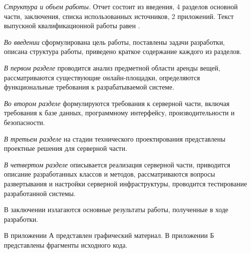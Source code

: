 \emph{Структура и объем работы.} Отчет состоит из введения, 4 разделов основной части, заключения, списка использованных источников, 2 приложений. Текст выпускной квалификационной работы равен .

\emph{Во введении} сформулирована цель работы, поставлены задачи разработки, описана структура работы, приведено краткое содержание каждого из разделов.

\emph{В первом разделе} проводится анализ предметной области аренды вещей, рассматриваются существующие онлайн-площадки, определяются функциональные требования к разрабатываемой системе.

\emph{Во втором разделе} формулируются требования к серверной части, включая требования к базе данных, программному интерфейсу, производительности и безопасности.

\emph{В третьем разделе} на стадии технического проектирования представлены проектные решения для серверной части.

\emph{В четвертом разделе} описывается реализация серверной части, приводится описание разработанных классов и методов, рассматриваются вопросы развертывания и настройки серверной инфраструктуры, проводится тестирование разработанной системы.

В заключении излагаются основные результаты работы, полученные в ходе разработки.

В приложении А представлен графический материал.
В приложении Б представлены фрагменты исходного кода. 
